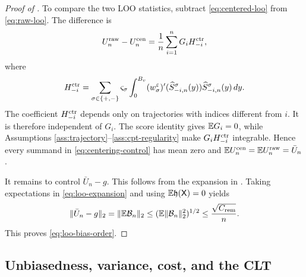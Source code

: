 \begin{proof}[Proof of ]
To compare the two LOO statistics, subtract \eqref{eq:centered-loo} from \eqref{eq:raw-loo}.  The difference is
\begin{equation}\label{eq:centering-control}
 U_n^{\rm raw}-U_n^{\rm cen}
 =\frac1n\sum_{i=1}^{n}G_i H_{-i}^{\rm ctr},
\end{equation}
where
\[
 H_{-i}^{\rm ctr}
 =\sum_{\sigma\in\{+,-\}}\varsigma_\sigma
 \int_0^{B_v}
 (w_\sigma^\varepsilon)'(\widehat S_{-i,n}^\sigma(y))
 \widehat S_{-i,n}^\sigma(y)\,dy.
\]
The coefficient $H_{-i}^{\rm ctr}$ depends only on trajectories with indices different from $i$.  It is therefore independent of $G_i$.  The score identity gives $\mathbb E G_i=0$, while Assumptions \ref{ass:trajectory}--\ref{ass:cpt-regularity} make $G_iH_{-i}^{\rm ctr}$ integrable.  Hence every summand in \eqref{eq:centering-control} has mean zero and
$\mathbb E U_n^{\rm cen}=\mathbb E U_n^{\rm raw}=\bar U_n$.

It remains to control $\bar U_n-g$.  This follows from the expansion in .  Taking expectations in \eqref{eq:loo-expansion} and using $\mathbb E\mathfrak h(\mathsf X)=0$ yields
\[
 \lVert\bar U_n-g\rVert_2
 =\lVert\mathbb E \mathcal B_n\rVert_2
 \le(\mathbb E\lVert\mathcal B_n\rVert_2^2)^{1/2}
 \le\frac{\sqrt{C_{\rm rem}}}{n}.
\]
This proves \eqref{eq:loo-bias-order}.
\end{proof}


\subsection{Unbiasedness, variance, cost, and the CLT}

